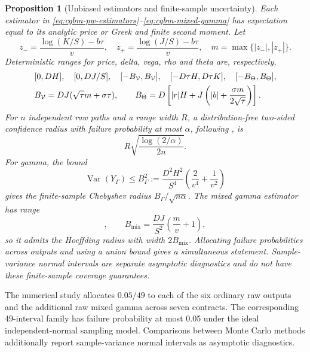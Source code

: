 \documentclass[11pt]{article}
\newtheorem{proposition}[theorem]{Proposition}
\begin{document}
\begin{proposition}[Unbiased estimators and finite-sample uncertainty]
\label{prop:cgbm-mc}
Each estimator in \eqref{eq:cgbm-pw-estimators}--\eqref{eq:cgbm-mixed-gamma}
has expectation equal to its analytic price or Greek and finite second
moment. Let
\begin{equation}
 z_- =\frac{\log(K/S)-b\tau}{v},\quad
 z_+ =\frac{\log(J/S)-b\tau}{v},\quad
 m=\max\{|z_-|,|z_+|\}.
 \label{eq:cgbm-active-z}
\end{equation}
Deterministic ranges for price, delta, vega, rho and theta are, respectively,
\begin{align}
 &[0,DH],\quad[0,DJ/S],\quad[-B_{\mathcal V},B_{\mathcal V}],
 \quad[-D\tau H,D\tau K],\quad[-B_\Theta,B_\Theta],\notag\\
 &B_{\mathcal V}=DJ(\sqrt{\tau}m+\sigma\tau),\qquad
 B_\Theta=D\left[|r|H+J\left(|b|+
 \frac{\sigma m}{2\sqrt{\tau}}\right)\right].
 \label{eq:cgbm-mc-ranges}
\end{align}
For $n$ independent raw paths and a range width $R$, a distribution-free
two-sided confidence radius with failure probability at most $\alpha$,
following \citet{hoeffding1963}, is
\begin{equation}
 R\sqrt{\frac{\log(2/\alpha)}{2n}}.
 \label{eq:cgbm-hoeffding}
\end{equation}
For gamma, the bound
\begin{equation}
 \operatorname{Var}(Y_\Gamma)
 \leq B_\Gamma^2
 :=\frac{D^2H^2}{S^4}\left(\frac{2}{v^4}+\frac{1}{v^2}\right)
 \label{eq:cgbm-gamma-variance}
\end{equation}
gives the finite-sample Chebyshev radius $B_\Gamma/\sqrt{n\alpha}$.
The mixed gamma estimator has range
\begin{equation}
 [-B_{\mathrm{mix}},B_{\mathrm{mix}}],\qquad
 B_{\mathrm{mix}}=\frac{DJ}{S^2}\left(\frac{m}{v}+1\right),
 \label{eq:cgbm-mixed-gamma-bound}
\end{equation}
so it admits the Hoeffding radius with width $2B_{\mathrm{mix}}$.
Allocating failure probabilities across outputs and using a union bound
gives a simultaneous statement. Sample-variance normal intervals are
separate asymptotic diagnostics and do not have these finite-sample
coverage guarantees.
\end{proposition}

The numerical study allocates $0.05/49$ to each of the six ordinary raw
outputs and the additional raw mixed gamma across seven contracts.
The corresponding 49-interval family has failure probability at most
0.05 under the ideal independent-normal sampling model. Comparisons
between Monte Carlo methods additionally report sample-variance normal
intervals as asymptotic diagnostics.
\end{document}
